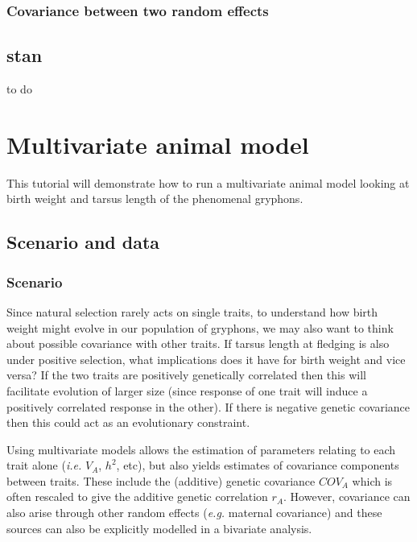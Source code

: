 \documentclass[
  12pt,
]{book}
\begin{document}
\hypertarget{covariance-between-two-random-effects-2}{%
\subsection{Covariance between two random effects}\label{covariance-between-two-random-effects-2}}

\hypertarget{stan}{%
\section{stan}\label{stan}}

to do

\hypertarget{multivariate-animal-model}{%
\chapter{Multivariate animal model}\label{multivariate-animal-model}}

This tutorial will demonstrate how to run a multivariate animal model looking at birth weight and tarsus length of the phenomenal gryphons.

\hypertarget{scenario-and-data-1}{%
\section{Scenario and data}\label{scenario-and-data-1}}

\hypertarget{scenario-1}{%
\subsection{Scenario}\label{scenario-1}}

Since natural selection rarely acts on single traits, to understand how birth weight might evolve in our population of gryphons, we may also want to think about possible covariance with other traits. If tarsus length at fledging is also under positive selection, what implications does it have for birth weight and vice versa? If the two traits are positively genetically correlated then this will facilitate evolution of larger size (since response of one trait will induce a positively correlated response in the other). If there is negative genetic covariance then this could act as an evolutionary constraint.

Using multivariate models allows the estimation of parameters relating to each trait alone (\emph{i.e.} \(V_A\), \(h^2\), etc), but also yields estimates of covariance components between traits. These include the (additive) genetic covariance \(COV_A\) which is often rescaled to give the additive genetic correlation \(r_A\). However, covariance can also arise through other random effects (\emph{e.g.} maternal covariance) and these sources can also be explicitly modelled in a bivariate analysis.
\end{document}
